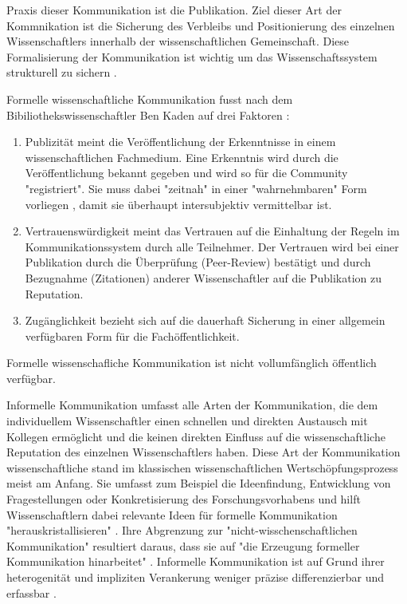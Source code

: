 Praxis dieser Kommunikation ist die Publikation. Ziel dieser Art der Kommnikation ist die Sicherung des Verbleibs und Positionierung des einzelnen Wissenschaftlers innerhalb der wissenschaftlichen Gemeinschaft. Diese Formalisierung der Kommunikation ist wichtig um das Wissenschaftssystem strukturell zu sichern \cite{kaden_2009_library}.

Formelle wissenschaftliche Kommunikation fusst nach dem Bibiliothekswissenschaftler Ben Kaden auf drei Faktoren \cite{kaden_2009_library}:
\begin{enumerate}
\item Publizität meint die Veröffentlichung der Erkenntnisse in einem wissenschaftlichen Fachmedium. Eine Erkenntnis wird durch die Veröffentlichung bekannt gegeben und wird so für die Community "registriert".  Sie muss dabei "zeitnah" in einer "wahrnehmbaren" Form vorliegen \cite{Schimank_2012}, damit sie überhaupt intersubjektiv vermittelbar ist.
\item Vertrauenswürdigkeit meint das Vertrauen auf die Einhaltung der Regeln im Kommunikationssystem durch alle Teilnehmer. Der Vertrauen wird bei einer Publikation durch die Überprüfung (Peer-Review) bestätigt und durch Bezugnahme (Zitationen) anderer Wissenschaftler auf die Publikation zu Reputation.
\item Zugänglichkeit bezieht sich auf die dauerhaft Sicherung in einer allgemein verfügbaren Form für die Fachöffentlichkeit.
\end{enumerate}

Formelle wissenschafliche Kommunikation ist nicht vollumfänglich öffentlich verfügbar.

Informelle Kommunikation umfasst alle Arten der Kommunikation, die dem individuellem Wissenschaftler einen schnellen und direkten Austausch mit Kollegen ermöglicht und die keinen direkten Einfluss auf die wissenschaftliche Reputation des einzelnen Wissenschaftlers haben. Diese Art der Kommunikation wissenschaftliche stand im klassischen wissenschaftlichen Wertschöpfungsprozess meist am Anfang. Sie umfasst zum Beispiel die Ideenfindung, Entwicklung von Fragestellungen oder Konkretisierung des Forschungsvorhabens und hilft Wissenschaftlern dabei relevante Ideen für formelle Kommunikation "herauskristallisieren" \cite{Hanekop_2014}. Ihre Abgrenzung zur "nicht-wisschenschaftlichen Kommunikation" resultiert daraus, dass sie auf "die Erzeugung formeller Kommunikation hinarbeitet" \cite{kaden_2009_library}. Informelle Kommunikation ist auf Grund ihrer heterogenität und impliziten Verankerung weniger präzise differenzierbar und erfassbar \cite{kaden_2009_library}.

